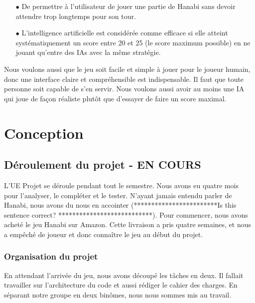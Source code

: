 \documentclass[11pt, letterpaper]{article}
\begin{document}
\begin{itemize}
    \item[$\bullet$] De permettre à l'utilisateur de jouer une partie de Hanabi sans devoir attendre trop longtemps pour son tour.\\

    \item[$\bullet$] L'intelligence artificielle est considérée comme efficace si elle atteint systématiquement un score entre 20 et 25 (le score maximum possible) en ne jouant qu'entre des IAs avec la même stratégie.\\
\end{itemize}

\noindent
Nous voulons aussi que le jeu soit facile et simple à jouer pour le joueur humain, donc une interface claire et compréhensible est indispensable. Il faut que toute personne soit capable de s'en servir. Nous voulons aussi avoir au moins une IA qui joue de façon réaliste plutôt que d'essayer de faire un score maximal.


\section{Conception}

\subsection{Déroulement du projet - EN COURS}

\noindent L'UE Projet se déroule pendant tout le semestre. Nous avons eu quatre mois pour l'analyser, le compléter et le tester. N'ayant jamais entendu parler de Hanabi, nous avons du nous en accointer (************************Is this sentence correct? ***************************). Pour commencer, nous avons acheté le jeu Hanabi sur Amazon. Cette livraison a pris quatre semaines, et nous a empêché de joueur et donc connaître le jeu au début du projet. 

\subsubsection{Organisation du projet}

\noindent En attendant l'arrivée du jeu, nous avons découpé les tâches en deux. Il fallait travailler sur l'architecture du code et aussi rédiger le cahier des charges. En séparant notre groupe en deux binômes, nous nous sommes mis au travail.\\
\end{document}
